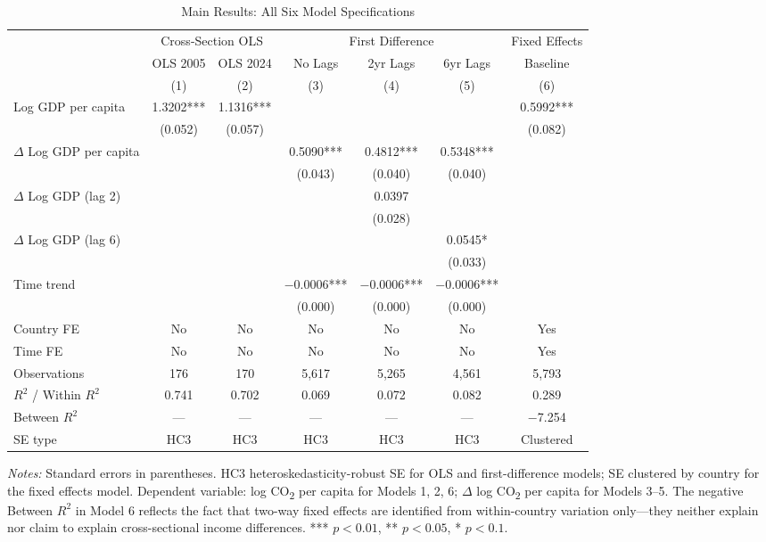 \documentclass[12pt, a4paper]{article}
\begin{document}
\begin{table}[H]
\centering
\caption{Main Results: All Six Model Specifications}
\label{tab:main}
\begin{adjustbox}{max width=\textwidth}
\begin{threeparttable}
\small
\setlength{\tabcolsep}{5pt}
\begin{tabular}{lcccccc}
\toprule
 & \multicolumn{2}{c}{Cross-Section OLS} & \multicolumn{3}{c}{First Difference} & Fixed Effects \\
\cmidrule(lr){2-3}\cmidrule(lr){4-6}\cmidrule(lr){7-7}
 & OLS 2005 & OLS 2024 & No Lags & 2yr Lags & 6yr Lags & Baseline \\
 & (1) & (2) & (3) & (4) & (5) & (6) \\
\midrule
Log GDP per capita
    & 1.3202*** & 1.1316*** & & & & 0.5992*** \\
    & (0.052)   & (0.057)   & & & & (0.082)   \\[4pt]
$\Delta$ Log GDP per capita
    & & & 0.5090*** & 0.4812*** & 0.5348*** & \\
    & & & (0.043)   & (0.040)   & (0.040)   & \\[4pt]
$\Delta$ Log GDP (lag 2)
    & & & & 0.0397 & & \\
    & & & & (0.028) & & \\[4pt]
$\Delta$ Log GDP (lag 6)
    & & & & & 0.0545* & \\
    & & & & & (0.033) & \\[4pt]
Time trend
    & & & $-$0.0006*** & $-$0.0006*** & $-$0.0006*** & \\
    & & & (0.000)     & (0.000)     & (0.000)     & \\
\midrule
Country FE   & No  & No  & No    & No    & No    & Yes   \\
Time FE      & No  & No  & No    & No    & No    & Yes   \\
Observations & 176 & 170 & 5,617 & 5,265 & 4,561 & 5,793 \\
$R^2$ / Within $R^2$ & 0.741 & 0.702 & 0.069 & 0.072 & 0.082 & 0.289 \\
Between $R^2$ & --- & --- & --- & --- & --- & $-$7.254 \\
SE type & HC3 & HC3 & HC3 & HC3 & HC3 & Clustered \\
\bottomrule
\end{tabular}
\begin{tablenotes}
\small
\item \textit{Notes:} Standard errors in parentheses. HC3 heteroskedasticity-robust SE for OLS and first-difference models; SE clustered by country for the fixed effects model. Dependent variable: log CO\textsubscript{2} per capita for Models 1, 2, 6; $\Delta$ log CO\textsubscript{2} per capita for Models 3--5. The negative Between $R^2$ in Model 6 reflects the fact that two-way fixed effects are identified from within-country variation only---they neither explain nor claim to explain cross-sectional income differences. *** $p<0.01$, ** $p<0.05$, * $p<0.1$.
\end{tablenotes}
\end{threeparttable}
\end{adjustbox}
\end{table}
\end{document}

